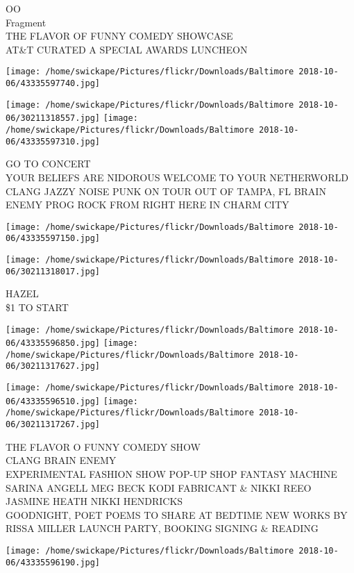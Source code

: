 \documentclass[10pt,letterpaper]{article}
\begin{document}
OO\\
Fragment\\
THE FLAVOR OF FUNNY COMEDY SHOWCASE\\
AT\&T CURATED A SPECIAL AWARDS LUNCHEON
\pagebreak

\texttt{[image: /home/swickape/Pictures/flickr/Downloads/Baltimore 2018-10-06/43335597740.jpg]}

\vspace{0.25in}
\texttt{[image: /home/swickape/Pictures/flickr/Downloads/Baltimore 2018-10-06/30211318557.jpg]}
\texttt{[image: /home/swickape/Pictures/flickr/Downloads/Baltimore 2018-10-06/43335597310.jpg]}

GO TO CONCERT\\
YOUR BELIEFS ARE NIDOROUS WELCOME TO YOUR NETHERWORLD\\
CLANG JAZZY NOISE PUNK ON TOUR OUT OF TAMPA, FL BRAIN ENEMY PROG ROCK FROM RIGHT HERE IN CHARM CITY
\pagebreak

\texttt{[image: /home/swickape/Pictures/flickr/Downloads/Baltimore 2018-10-06/43335597150.jpg]}

\vspace{0.25in}
\texttt{[image: /home/swickape/Pictures/flickr/Downloads/Baltimore 2018-10-06/30211318017.jpg]}

HAZEL\\
\$1 TO START
\pagebreak

\texttt{[image: /home/swickape/Pictures/flickr/Downloads/Baltimore 2018-10-06/43335596850.jpg]}
\texttt{[image: /home/swickape/Pictures/flickr/Downloads/Baltimore 2018-10-06/30211317627.jpg]}

\texttt{[image: /home/swickape/Pictures/flickr/Downloads/Baltimore 2018-10-06/43335596510.jpg]}
\texttt{[image: /home/swickape/Pictures/flickr/Downloads/Baltimore 2018-10-06/30211317267.jpg]}

THE FLAVOR O FUNNY COMEDY SHOW\\
CLANG BRAIN ENEMY\\
EXPERIMENTAL FASHION SHOW POP{-}UP SHOP FANTASY MACHINE SARINA ANGELL MEG BECK KODI FABRICANT \& NIKKI  REEO JASMINE HEATH NIKKI HENDRICKS\\
GOODNIGHT, POET POEMS TO SHARE AT BEDTIME NEW WORKS BY RISSA MILLER LAUNCH PARTY, BOOKING SIGNING \& READING
\pagebreak

\texttt{[image: /home/swickape/Pictures/flickr/Downloads/Baltimore 2018-10-06/43335596190.jpg]}
\end{document}
